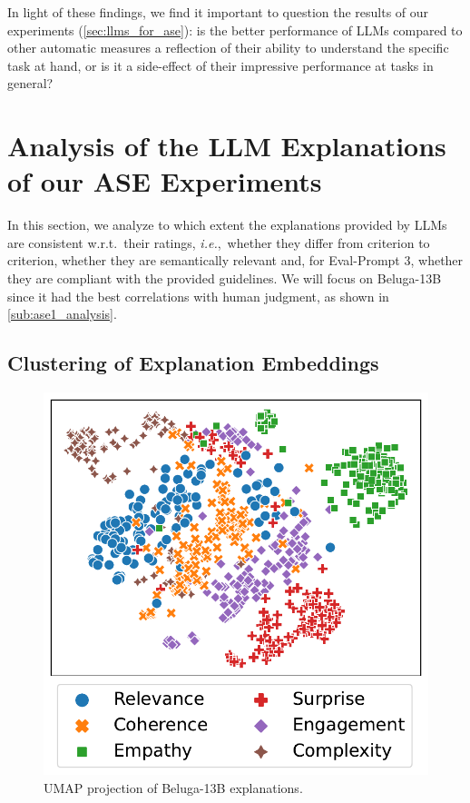 In light of these findings, we find it important to question the results of our {\ase} experiments (\autoref{sec:llms_for_ase}): is the better performance of LLMs compared to other automatic measures a reflection of their ability to understand the specific task at hand, or is it a side-effect of their impressive performance at {\nlp} tasks in general?

\section{Analysis of the LLM Explanations of our ASE Experiments}
\label{sec:ase3_explainability}

In this section, we analyze to which extent the explanations provided by LLMs are consistent w.r.t.\ their ratings, \textit{i.e.},\ whether they differ from criterion to criterion, whether they are semantically relevant and, for Eval-Prompt 3, whether they are compliant with the provided guidelines. We will focus on Beluga-13B since it had the best correlations with human judgment, as shown in \autoref{sub:ase1_analysis}.

\subsection{Clustering of Explanation Embeddings}
\label{sub:clustering_explanations}

\begin{figure}[h!]
\centering
\includegraphics[width=0.6\columnwidth]{pictures/embedding_umap_beluga.pdf}
\caption{UMAP projection of Beluga-13B explanations.}
\label{fig:umap_explanation_beluga}
\end{figure}

